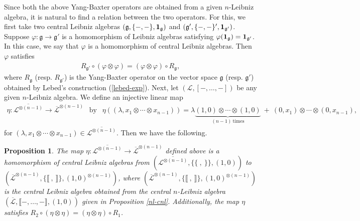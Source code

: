 \documentclass[a4paper,reqno,10pt]{amsart}
\theoremstyle{plain}
\newtheorem{prop}[thm]{Proposition}
\theoremstyle{definition}
\theoremstyle{remark}
\begin{document}
Since both the above Yang-Baxter operators are obtained from a given $n$-Leibniz algebra, it is natural to find a relation between the two operators. For this, we first take two central Leibniz algebras $(\mathfrak{g}, \{ -, - \}, {\bf 1}_{\mathfrak{g}})$ and $(\mathfrak{g}', \{ -, - \}', {\bf 1}_{\mathfrak{g}'})$. Suppose $\varphi : \mathfrak{g} \rightarrow \mathfrak{g}'$ is a homomorphism of Leibniz algebras satisfying $\varphi ({\bf 1}_\mathfrak{g}) = {\bf 1}_{\mathfrak{g}'}$. In this case, we say that $\varphi$ is a homomorphism of central Leibniz algebras. Then $\varphi $ satisfies
\begin{align*}
   R_{\mathfrak{g}'} \circ ( \varphi \otimes \varphi ) = ( \varphi \otimes \varphi ) \circ R_\mathfrak{g},
\end{align*}
where $R_\mathfrak{g}$ (resp. $R_{\mathfrak{g}'}$) is the Yang-Baxter operator on the vector space $\mathfrak{g}$ (resp. $\mathfrak{g}'$) obtained by Lebed's construction (\ref{lebed-exp}). Next, let $(\mathcal{L}, [-, \ldots, - ])$ be any given $n$-Leibniz algebra. We define an injective linear map 
 \begin{align}\label{eta-map}
       \eta: \overline{ \mathcal{L}^{\otimes (n-1)}} \rightarrow \overline{\mathcal{L}}^{\otimes (n-1)} ~~ \text{ by } ~~ \eta ( (\lambda, x_1 \otimes \cdots \otimes x_{n-1})) = \lambda \underbrace{(1, 0) \otimes \cdots \otimes (1, 0)}_{(n-1) \mathrm{~ times}} ~+~ (0, x_1) \otimes \cdots \otimes (0, x_{n-1}),
    \end{align}
    for $ (\lambda, x_1 \otimes \cdots \otimes x_{n-1}) \in \overline{ \mathcal{L}^{\otimes (n-1)}} $. Then we have the following. 

\begin{prop}
    The map $\eta : \overline{ \mathcal{L}^{\otimes (n-1)}} \rightarrow \overline{\mathcal{L}}^{\otimes (n-1)}$ defined above is a homomorphism of central Leibniz algebras from $ ( \overline{\mathcal{L}^{\otimes (n-1)}}, \{ \! \! \{ ~, ~ \} \! \! \}, (1, 0) )$ to $(\overline{\mathcal{L}}^{\otimes (n-1)} ,  \{ \! \llbracket ~, ~ \rrbracket \! \}, (1,0)^{\otimes (n-1)} )$, where $(\overline{\mathcal{L}}^{\otimes (n-1)} ,  \{ \! \llbracket ~, ~ \rrbracket \! \}, (1,0)^{\otimes (n-1)} )$ is the central Leibniz algebra obtained from the central $n$-Leibniz algebra $(\overline{\mathcal{L}}, \llbracket -, \ldots, - \rrbracket ,(1, 0))$ given in Proposition \ref{nl-cnl}. Additionally, the map $\eta$ satisfies $R_2 \circ (\eta \otimes \eta) = (\eta \otimes \eta) \circ R_1$.
\end{prop}
\end{document}
